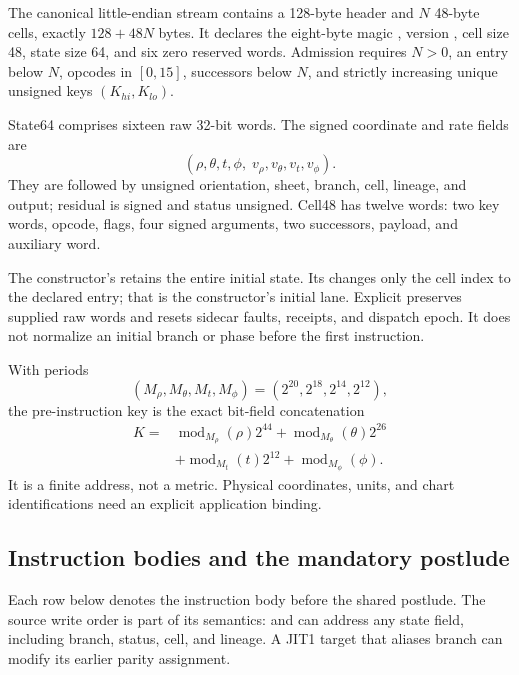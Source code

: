 The canonical little-endian stream contains a 128-byte header and $N$
48-byte cells, exactly $128+48N$ bytes. It declares the eight-byte magic
, version , cell size 48,
state size 64, and six zero reserved words. Admission requires $N>0$,
an entry below $N$, opcodes in $[0,15]$, successors below $N$, and
strictly increasing unique unsigned keys $(K_{hi},K_{lo})$.

State64 comprises sixteen raw 32-bit words. The signed coordinate and rate
fields are
\[
 (\rho,\theta,t,\phi,\;v_\rho,v_\theta,v_t,v_\phi).
\]
They are followed by unsigned orientation, sheet, branch, cell, lineage, and output;
residual is signed and status unsigned. Cell48 has twelve words:
two key words, opcode, flags, four signed arguments, two successors,
payload, and auxiliary word.

The constructor's  retains the entire initial
state. Its  changes only the cell index to the
declared entry; that is the constructor's initial lane. Explicit
 preserves supplied raw words and resets sidecar
faults, receipts, and dispatch epoch. It does not normalize an initial
branch or phase before the first instruction.

With periods
\begin{equation}
 (M_\rho,M_\theta,M_t,M_\phi)=(2^{20},2^{18},2^{14},2^{12}),
 \label{eq:r16-periods}
\end{equation}
the pre-instruction key is the exact bit-field concatenation
\begin{equation}
 \begin{split}
 K={}&\operatorname{mod}_{M_\rho}(\rho)2^{44}
      +\operatorname{mod}_{M_\theta}(\theta)2^{26}\\
    &+\operatorname{mod}_{M_t}(t)2^{12}
      +\operatorname{mod}_{M_\phi}(\phi).
 \end{split}
 \label{eq:r16-address}
\end{equation}
It is a finite address, not a metric. Physical coordinates, units, and
chart identifications need an explicit application binding.

\subsection{Instruction bodies and the mandatory postlude}

Each row below denotes the instruction body before the shared postlude.
The source write order is part of its semantics:  and
 can address any state field, including branch, status,
cell, and lineage. A JIT1 target that aliases branch can modify its
earlier parity assignment.

